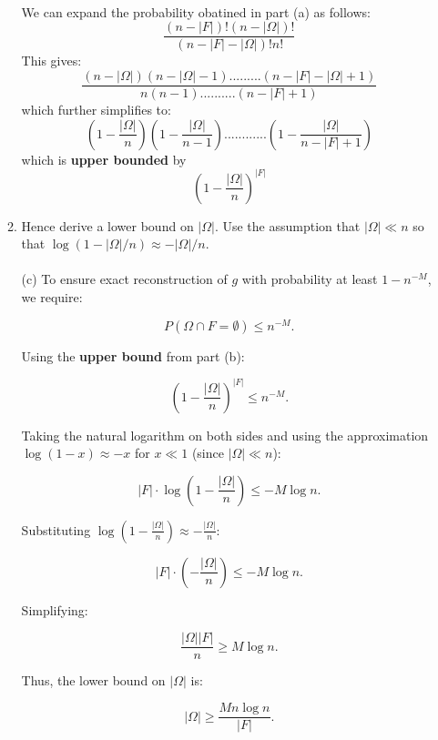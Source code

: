 \documentclass{article}
\begin{document}
\begin{enumerate}
\begin{enumerate}
    \\
    We can expand the probability obatined in part (a) as follows:
    \[
    \frac{(n-|F|)! (n-|\Omega|)!}{(n-|F|-|\Omega|)! n!}
    \]
    This gives:
    \[
    \frac{(n-|\Omega|)(n-|\Omega|-1).........(n-|F|-|\Omega|+1)}{n(n-1)..........(n-|F|+1)}
    \]
    which further simplifies to:
    \[
    (1-\frac{|\Omega|}{n})(1-\frac{|\Omega|}{n-1})............(1-\frac{|\Omega|}{n-|F|+1})
    \]
    which is \textbf{upper bounded} by \[
    (1-\frac{|\Omega|}{n})^{|F|}
    \]
    
            \item 
                Hence derive a lower bound on $|\Omega|$. Use the assumption that $|\Omega| \ll n$ so that $\log(1-|\Omega|/n) \approx -|\Omega|/n$.
        \\
    
    \\
    (c) To ensure exact reconstruction of \(g\) with probability at least \(1 - n^{-M}\), we require:

\[
P(\Omega \cap F = \emptyset) \leq n^{-M}.
\]

Using the \textbf{upper bound} from part (b):

\[
\left(1 - \frac{|\Omega|}{n}\right)^{|F|} \leq n^{-M}.
\]

Taking the natural logarithm on both sides and using the approximation \(\log(1 - x) \approx -x\) for \(x \ll 1\) (since \(|\Omega| \ll n\)):

\[
|F| \cdot \log\left(1 - \frac{|\Omega|}{n}\right) \leq -M \log n.
\]

Substituting \(\log(1 - \frac{|\Omega|}{n}) \approx -\frac{|\Omega|}{n}\):

\[
|F| \cdot \left(-\frac{|\Omega|}{n}\right) \leq -M \log n.
\]

Simplifying:

\[
\frac{|\Omega||F|}{n} \geq M \log n.
\]

Thus, the lower bound on \(|\Omega|\) is:

\[
|\Omega| \geq \frac{M n \log n}{|F|}.
\]

    
        \end{enumerate}
\end{enumerate}
\end{document}
